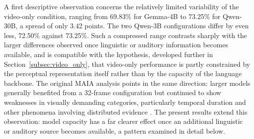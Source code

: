 A first descriptive observation concerns the relatively limited variability of the video-only condition, ranging from 69.83\% for Gemma-4B    to 73.25\% for Qwen-30B, a spread of only 3.42 points. The two Qwen-3B configurations differ by even less, 72.50\% against 73.25\%. Such a compressed range contrasts sharply with the larger differences observed once linguistic or auditory information becomes available, and is compatible with the hypothesis, developed further in Section~\ref{subsec:video_only}, that video-only performance is partly constrained by the perceptual representation itself rather than by the capacity of the language backbone. The original MAIA analysis points in the same direction: larger models generally benefited from a 32-frame configuration but continued to show weaknesses in visually demanding categories, particularly temporal duration and other phenomena involving distributed evidence \cite{testa2025maia}. The present results extend this observation: model capacity has a far clearer effect once an additional linguistic or auditory source becomes available, a pattern examined in detail below.
